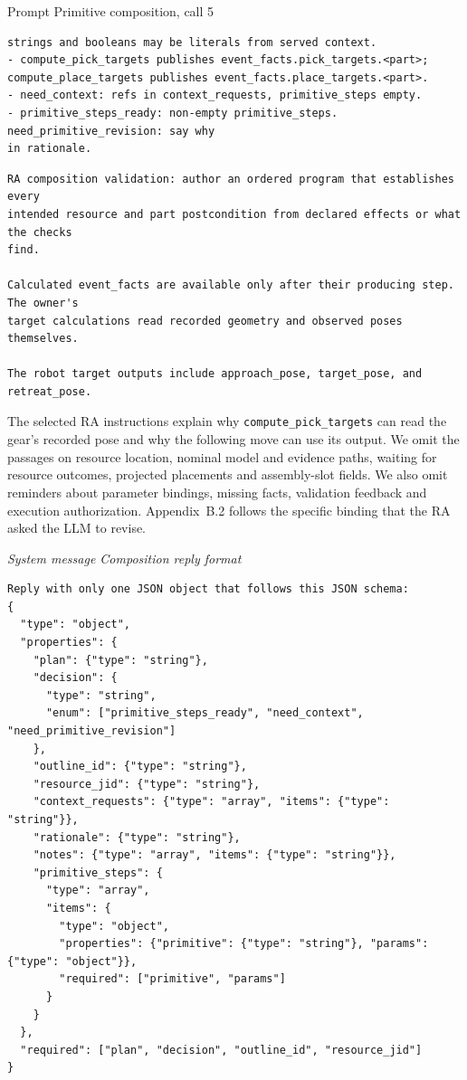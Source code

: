 \documentclass[preprint,12pt,authoryear]{elsarticle}
\let\code\nolinkurl
\newcommand{\recordlabel}[1]{\par\Needspace{4\baselineskip}\smallskip
  {\small\itshape #1\par}\nopagebreak}
\begin{document}
\begin{recordbox}[breakable]{Prompt \enspace Primitive composition, call 5}
\begin{lstlisting}[style=recorded]
strings and booleans may be literals from served context.
- compute_pick_targets publishes event_facts.pick_targets.<part>;
compute_place_targets publishes event_facts.place_targets.<part>.
- need_context: refs in context_requests, primitive_steps empty.
- primitive_steps_ready: non-empty primitive_steps. need_primitive_revision: say why
in rationale.
\end{lstlisting}
\medskip
\begin{lstlisting}[style=recorded]
RA composition validation: author an ordered program that establishes every
intended resource and part postcondition from declared effects or what the checks
find.

Calculated event_facts are available only after their producing step. The owner's
target calculations read recorded geometry and observed poses themselves.

The robot target outputs include approach_pose, target_pose, and retreat_pose.
\end{lstlisting}
\end{recordbox}

The selected RA instructions explain why \code{compute_pick_targets} can read the
gear's recorded pose and why the following move can use its output. We omit
the passages on resource location, nominal model and evidence paths, waiting
for resource outcomes, projected placements and assembly-slot fields. We
also omit reminders about parameter bindings, missing facts, validation
feedback and execution authorization. Appendix~B.2 follows the specific
binding that the RA asked the LLM to revise.

\recordlabel{System message \enspace Composition reply format}
\begin{lstlisting}[style=recorded]
Reply with only one JSON object that follows this JSON schema:
{
  "type": "object",
  "properties": {
    "plan": {"type": "string"},
    "decision": {
      "type": "string",
      "enum": ["primitive_steps_ready", "need_context", "need_primitive_revision"]
    },
    "outline_id": {"type": "string"},
    "resource_jid": {"type": "string"},
    "context_requests": {"type": "array", "items": {"type": "string"}},
    "rationale": {"type": "string"},
    "notes": {"type": "array", "items": {"type": "string"}},
    "primitive_steps": {
      "type": "array",
      "items": {
        "type": "object",
        "properties": {"primitive": {"type": "string"}, "params": {"type": "object"}},
        "required": ["primitive", "params"]
      }
    }
  },
  "required": ["plan", "decision", "outline_id", "resource_jid"]
}
\end{lstlisting}
\end{document}
